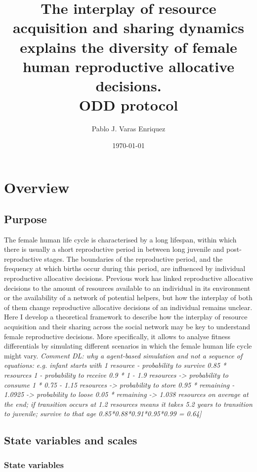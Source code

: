\documentclass{article}
\title{The interplay of resource acquisition and sharing dynamics explains the diversity of female human reproductive allocative decisions.
\\
ODD protocol}
\author{Pablo J. Varas Enriquez}
\date{\today}
\begin{document}
\maketitle

\tableofcontents

\section{Overview}

\subsection{Purpose}

The female human life cycle is characterised by a long lifespan, within which there is usually a short reproductive period in between long juvenile and post-reproductive stages. The boundaries of the reproductive period, and the frequency at which births occur during this period, are influenced by individual reproductive allocative decisions. Previous work has linked reproductive allocative decisions to the amount of resources available to an individual in its environment or the availability of a network of potential helpers, but how the interplay of both of them change reproductive allocative decisions of an individual remains unclear. Here I develop a theoretical framework to describe how the interplay of resource acquisition and their sharing across the social network may be key to understand female reproductive decisions. More specifically, it allows to analyse fitness differentials by simulating different scenarios in which the female human life cycle might vary. \emph{Comment DL: why a agent-based simulation and not a sequence of equations: e.g. infant starts with 1 resource - probability to survive 0.85 * resources 1 - probability to receive 0.9 * 1 - 1.9 resources -> probability to consume 1 * 0.75 - 1.15 resources -> probability to store 0.95 * remaining - 1.0925 -> probability to loose 0.05 * remaining -> 1.038 resources on average at the end; if transition occurs at 1.2 resources means it takes 5.2 years to transition to juvenile; survive to that age 0.85*0.88*0.91*0.95*0.99 = 0.64]}

\subsection{State variables and scales}

\subsubsection{State variables}
\end{document}
